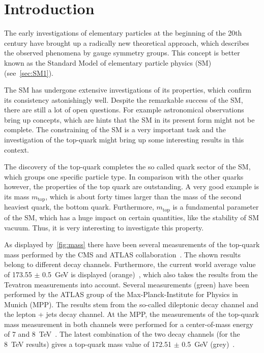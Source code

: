 \chapter{Introduction}

\label{sec:intro}

The early investigations of elementary particles at the beginning of the 20th century have brought up a radically new theoretical approach, which describes the observed phenomena by gauge symmetry groups. This concept is better known as the Standard Model of elementary particle physics (SM) (see~\cref{sec:SM1}).

The SM has undergone extensive investigations of its properties, which confirm its consistency astonishingly well. Despite the remarkable success of the SM, there are still a lot of open questions. For example astronomical observations  bring up concepts, which are hints that the SM in its present form might not be complete. The constraining of the SM  is a very important task and the investigation of the top-quark might bring up some interesting results in this context. 

The discovery of the top-quark completes the so called quark sector of the SM, which groups one specific particle type. In comparison with the other quarks however, the properties of the top quark are outstanding. A very good example  is its mass $m_{\text{top}}$, which is about forty times larger than the mass of the second heaviest quark, the bottom quark. Furthermore, $m_{\text{top}}$ is a fundamental parameter of the SM, which has a huge impact on certain quantities, like the stability of SM vacuum.  Thus, it is very interesting to investigate this property.

As displayed by~\cref{fig:mass} there have been several measurements of the top-quark mass performed by the CMS and ATLAS collaboration~\cite{PubR}. The shown results belong to different decay channels. Furthermore, the current world average value of 173.55 $\pm$ 0.5~GeV is displayed (orange)~\cite{ATLAS:2014wva}, which also takes the results from the Tevatron measurements into account. Several measurements (green) have been performed by the ATLAS group of the Max-Planck-Institute for Physics in Munich (MPP). The results stem from the so-called dileptonic decay channel and the lepton + jets decay channel. At the MPP, the measurements of the top-quark mass measurement in both channels were performed for a center-of-mass energy of 7 and 8~TeV~\cite{Aad:2015nba,Aaboud:2016igd,ATLAS-CONF-2017-071}. 
The latest combination of the two decay channels  (for the  8~TeV results) gives a top-quark mass value of 172.51 $\pm$ 0.5~GeV (grey)~\cite{ATLAS-CONF-2017-071}.

